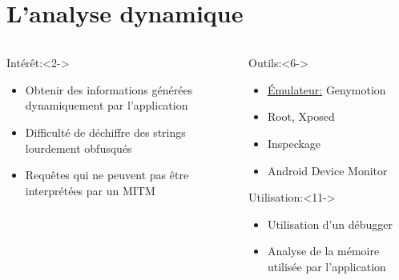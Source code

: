\documentclass[aspectratio=1610, ]{beamer}%
\begin{document}

 \section{L'analyse dynamique}
\begin{frame}
  \slidetitle[]
  \begin{columns}
    \begin{column}{0.48\linewidth}
      \begin{block}{Intérêt:}<2->
        \begin{itemize}
        \item<3-> Obtenir des informations générées dynamiquement par l'application
        \item<4-> Difficulté de déchiffre des strings lourdement obfusqués
        \item<5-> Requêtes qui ne peuvent pas être interprétées par un MITM
        \end{itemize}
      \end{block}
    \end{column}
    \begin{column}{0.48\linewidth}
      \begin{block}{Outils:}<6->
        \begin{itemize}
        \item<7-> \uline{Émulateur:} Genymotion
        \item<8-> Root, Xposed
        \item<9-> Inspeckage
        \item<10-> Android Device Monitor
        \end{itemize}
      \end{block}
      \begin{block}{Utilisation:}<11->
        \begin{itemize}
        \item<12-> Utilisation d'un débugger
        \item<13-> Analyse de la mémoire utilisée par l'application
      \end{itemize}
      \end{block}
    \end{column}
  \end{columns}
\end{frame}
\end{document}
